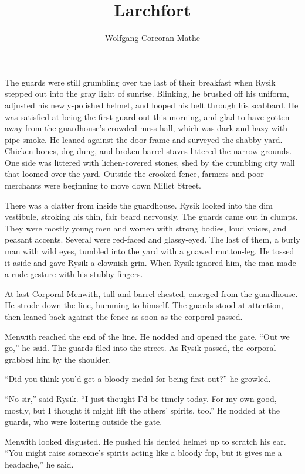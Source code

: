 \documentclass[10pt,b5paper]{article}
\begin{document}
\title{Larchfort}
\author{Wolfgang Corcoran-Mathe}
\date{}
\maketitle

The guards were still grumbling over the last of their breakfast
when Rysik stepped out into the gray light of sunrise. Blinking,
he brushed off his uniform, adjusted his newly-polished helmet,
and looped his belt through his scabbard. He was satisfied at being
the first guard out this morning, and glad to have gotten away from
the guardhouse's crowded mess hall, which was dark and hazy with
pipe smoke. He leaned against the door frame and surveyed the shabby
yard. Chicken bones, dog dung, and broken barrel-staves littered the
narrow grounds. One side was littered with lichen-covered stones,
shed by the crumbling city wall that loomed over the yard. Outside
the crooked fence, farmers and poor merchants were beginning to
move down Millet Street.

There was a clatter from inside the guardhouse. Rysik looked into
the dim vestibule, stroking his thin, fair beard nervously. The
guards came out in clumps. They were mostly young men and women
with strong bodies, loud voices, and peasant accents. Several were
red-faced and glassy-eyed. The last of them, a burly man with wild
eyes, tumbled into the yard with a gnawed mutton-leg. He tossed
it aside and gave Rysik a clownish grin. When Rysik ignored him,
the man made a rude gesture with his stubby fingers.

At last Corporal Menwith, tall and barrel-chested, emerged from the
guardhouse. He strode down the line, humming to himself. The guards
stood at attention, then leaned back against the fence as soon as
the corporal passed.

Menwith reached the end of the line. He nodded and opened the
gate. ``Out we go,'' he said. The guards filed into the street. As
Rysik passed, the corporal grabbed him by the shoulder.

``Did you think you'd get a bloody medal for being first out?''
he growled.

``No sir,'' said Rysik. ``I just thought I'd be timely today. For my
own good, mostly, but I thought it might lift the others' spirits,
too.'' He nodded at the guards, who were loitering outside the gate.

Menwith looked disgusted. He pushed his dented helmet up to scratch
his ear. ``You might raise someone's spirits acting like a bloody fop,
but it gives me a headache,'' he said.
\end{document}
